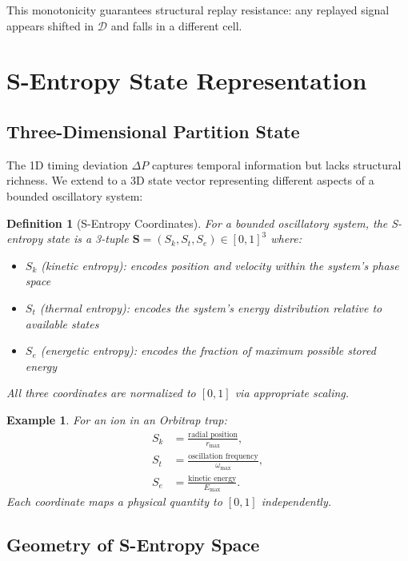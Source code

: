 \documentclass[twocolumn,11pt,a4paper]{article}
\newtheorem{definition}[theorem]{Definition}
\newtheorem{example}[theorem]{Example}
\newcommand{\DP}{\Delta P}
\newcommand{\Sk}{S_{k}}
\newcommand{\St}{S_{t}}
\newcommand{\Se}{S_{e}}
\newcommand{\Stuple}{\mathbf{S}}
\newcommand{\calD}{\mathcal{D}}
\begin{document}
This monotonicity guarantees structural replay resistance: any replayed signal appears shifted in $\calD$ and falls in a different cell.

\section{S-Entropy State Representation}
\label{sec:sentropy}

\subsection{Three-Dimensional Partition State}

The 1D timing deviation $\DP$ captures temporal information but lacks structural richness. We extend to a 3D state vector representing different aspects of a bounded oscillatory system:

\begin{definition}[S-Entropy Coordinates]
For a bounded oscillatory system, the \emph{S-entropy state} is a 3-tuple $\Stuple = (\Sk, \St, \Se) \in [0,1]^3$ where:
\begin{itemize}[nosep,leftmargin=1em]
  \item $\Sk$ (kinetic entropy): encodes position and velocity within the system's phase space
  \item $\St$ (thermal entropy): encodes the system's energy distribution relative to available states
  \item $\Se$ (energetic entropy): encodes the fraction of maximum possible stored energy
\end{itemize}
All three coordinates are normalized to $[0,1]$ via appropriate scaling.
\end{definition}

\begin{example}
For an ion in an Orbitrap trap:
\begin{align}
\Sk &= \frac{\text{radial position}}{r_{\max}}, \\
\St &= \frac{\text{oscillation frequency}}{\omega_{\max}}, \\
\Se &= \frac{\text{kinetic energy}}{E_{\max}}.
\end{align}
Each coordinate maps a physical quantity to $[0,1]$ independently.
\end{example}

\subsection{Geometry of S-Entropy Space}
\end{document}
